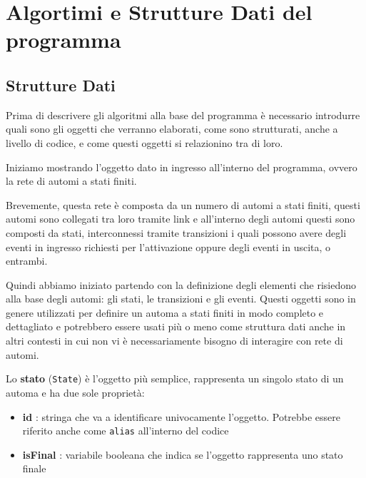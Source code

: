 \section{Algortimi e Strutture Dati del programma}

\subsection{Strutture Dati}

Prima di descrivere gli algoritmi alla base del programma è necessario introdurre quali sono gli oggetti che verranno elaborati, come sono strutturati, anche a livello di codice, e come questi oggetti si relazionino tra di loro.

Iniziamo mostrando l'oggetto dato in ingresso all'interno del programma, ovvero la rete di automi a stati finiti. 

Brevemente, questa rete è composta da un numero di automi a stati finiti, questi automi sono collegati tra loro tramite link e all'interno degli automi questi sono composti da stati, interconnessi tramite transizioni i quali possono avere degli eventi in ingresso richiesti per l'attivazione oppure degli eventi in uscita, o entrambi. \newline

Quindi abbiamo iniziato partendo con la definizione degli elementi che risiedono alla base degli automi: gli stati, le transizioni e gli eventi. Questi oggetti sono in genere utilizzati per definire un automa a stati finiti in modo completo e dettagliato e potrebbero essere usati più o meno come struttura dati anche in altri contesti in cui non vi è necessariamente bisogno di interagire con rete di automi. \newline

Lo \textbf{stato} (\texttt{State}) è l'oggetto più semplice, rappresenta un singolo stato di un automa e ha due sole proprietà:
\begin{itemize}
    \item \textbf{id} : stringa che va a identificare univocamente l'oggetto. Potrebbe essere riferito anche come \texttt{alias} all'interno del codice
    \item \textbf{isFinal} : variabile booleana che indica se l'oggetto rappresenta uno stato finale
\end{itemize}

